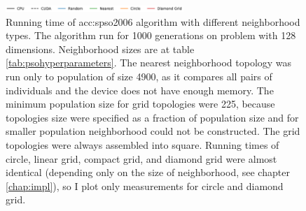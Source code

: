 \begin{figure}[ht!]
    \begin{minipage}{\textwidth}
        \centering
        \includegraphics[width=0.6\textwidth]{img/runs/time_pso_neigh_legend.pdf}
    \end{minipage}

    \caption[PSO2006 neighborhood running time]{Running time of \acrlong{acc:spso2006} algorithm with different neighborhood types. The algorithm run for 1000 generations on problem with 128 dimensions. Neighborhood sizes are at table \ref{tab:psohyperparameters}. The nearest neighborhood topology was run only to population of size 4900, as it compares all pairs of individuals and the device does not have enough memory. The minimum population size for grid topologies were 225, because topologies size were specified as a fraction of population size and for smaller population neighborhood could not be constructed. The grid topologies were always assembled into square. Running times of circle, linear grid, compact grid, and diamond grid were almost identical (depending only on the size of neighborhood, see chapter \ref{chap:impl}), so I plot only measurements for circle and diamond grid.}
    \label{meas:psoneigtime}
\end{figure}



